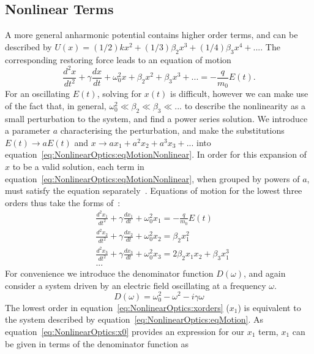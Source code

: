 \subsection{Nonlinear Terms}
A more general anharmonic potential contains higher order terms, and can be described by $U(x) = (1/2)kx^{2} + (1/3)\beta_2 x^3 + (1/4)\beta_3 x^4 + ...$. The corresponding restoring force leads to an equation of motion
\begin{equation}\label{eq:NonlinearOptics:eqMotionNonlinear}
	\frac{d^2 x}{dt^2} + \gamma \frac{dx}{dt} + \omega_{0}^2 x + \beta_2 x^2 +  \beta_3 x^3 + ... = -\frac{q}{m_{0} } E(t).
\end{equation}
For an oscillating $E(t)$, solving for $x(t)$ is difficult, however we can make use of the fact that, in general, $\omega_{0}^2 \ll \beta_2 \ll \beta_3 \ll ...$ to describe the nonlinearity as a small perturbation to the system, and find a power series solution. We introduce a parameter $a$ characterising the perturbation, and make the substitutions $E(t)\rightarrow aE(t)$ and $x \rightarrow ax_1 + a^2 x_2 + a^3 x_3 + ...$ into equation~\ref{eq:NonlinearOptics:eqMotionNonlinear}. In order for this expansion of $x$ to be a valid solution, each term in equation~\ref{eq:NonlinearOptics:eqMotionNonlinear}, when grouped by powers of $a$, must satisfy the equation separately~\cite[\S 1.4.1]{Boyd2008a}. Equations of motion for the lowest three orders thus take the forms of~\cite[\S 1.4.1]{Boyd2008a}:
\begin{equation}\label{eq:NonlinearOptics:xorders}
	\begin{split}
		& \frac{d^2 x_1}{dt^2} + \gamma \frac{dx_1}{dt} + \omega_{0}^2 x_1 = -\frac{q}{m_{0} } E(t) \\
		& \frac{d^2 x_2}{dt^2} + \gamma \frac{dx_2}{dt} + \omega_{0}^2 x_2 = \beta_2 x_1^2 \\
		& \frac{d^2 x_3}{dt^2} + \gamma \frac{dx_3}{dt} + \omega_{0}^2 x_3 = 2\beta_2 x_1 x_2 + \beta_3 x_1^3 \\
		& ...
	\end{split}
\end{equation}
For convenience we introduce the denominator function $D(\omega)$, and again consider a system driven by an electric field oscillating at a frequency $\omega$.
\begin{equation}
	D(\omega) = \omega_{0}^2 -\omega^2 -i \gamma \omega
\end{equation}
The lowest order in equation~\ref{eq:NonlinearOptics:xorders} ($x_{1}$) is equivalent to the system described by equation~\ref{eq:NonlinearOptics:eqMotion}. As equation~\ref{eq:NonlinearOptics:x0} provides an expression for our $x_1$ term, $x_1$ can be given in terms of the denominator function as
